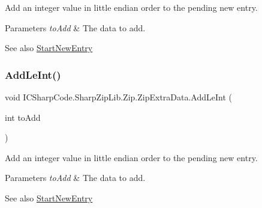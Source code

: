 Add an integer value in little endian order to the pending new entry. 


\begin{DoxyParams}{Parameters}
{\em to\+Add} & The data to add.\\
\hline
\end{DoxyParams}
\begin{DoxySeeAlso}{See also}
\hyperlink{class_i_c_sharp_code_1_1_sharp_zip_lib_1_1_zip_1_1_zip_extra_data_a3fd5ac216b1b6a0fe5ae92ea8156f20a}{Start\+New\+Entry}


\end{DoxySeeAlso}
\mbox{\label{class_i_c_sharp_code_1_1_sharp_zip_lib_1_1_zip_1_1_zip_extra_data_ac688733a0684d0e2a32da357d444212a}} 
\subsubsection{\texorpdfstring{Add\+Le\+Int()}{AddLeInt()}\hspace{0.1cm}{\footnotesize\ttfamily [2/2]}}
{\footnotesize\ttfamily void I\+C\+Sharp\+Code.\+Sharp\+Zip\+Lib.\+Zip.\+Zip\+Extra\+Data.\+Add\+Le\+Int (\begin{DoxyParamCaption}\item[{int}]{to\+Add }\end{DoxyParamCaption})\hspace{0.3cm}{\ttfamily [inline]}}



Add an integer value in little endian order to the pending new entry. 


\begin{DoxyParams}{Parameters}
{\em to\+Add} & The data to add.\\
\hline
\end{DoxyParams}
\begin{DoxySeeAlso}{See also}
\hyperlink{class_i_c_sharp_code_1_1_sharp_zip_lib_1_1_zip_1_1_zip_extra_data_a3fd5ac216b1b6a0fe5ae92ea8156f20a}{Start\+New\+Entry}


\end{DoxySeeAlso}
\mbox{\label{class_i_c_sharp_code_1_1_sharp_zip_lib_1_1_zip_1_1_zip_extra_data_aafc11e296c9769e11ddfbc07dee754e7}} 
